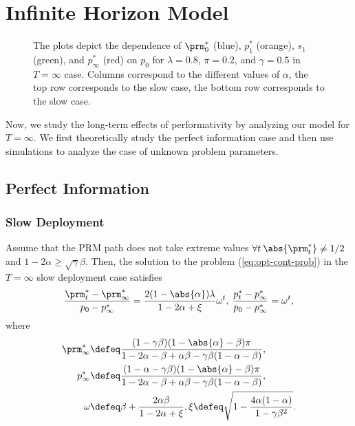 \section{Infinite Horizon Model}
\label{sec:infinite_horizon}

\begin{figure*}[ht]
    
    \caption{The plots depict the dependence of $\prm^*_0$ (blue), $p^*_1$
    (orange), $s_1$ (green), and $p^*_\infty$ (red) on $p_0$ for $\lambda =
    0.8$, $\pi = 0.2$, and $\gamma=0.5$ in $T=\infty$ case. Columns correspond
    to the different values of $\alpha$, the top row corresponds to the slow
    case, the bottom row corresponds to the slow case.}
    \label{fig:inf-sol}
\end{figure*}

Now, we study the long-term effects of performativity by analyzing our model
for $T=\infty$. We first theoretically study the perfect information case and then use simulations to analyze the case of unknown problem parameters.

\subsection{Perfect Information}
\label{sec:inf-slow}
\subsubsection{Slow Deployment}

\begin{theorem}
    \label{thm:inf-slow-sol}
    Assume that the PRM path does not take extreme values $\forall t \:
    \abs{\prm^*_t} \neq 1/2$ and $1 - 2 \alpha \ge \sqrt{\gamma} \beta$. Then,
    the solution to the problem (\ref{eq:opt-cont-prob}) in the $T=\infty$ slow deployment
    case satisfies
    \[
        \frac{\prm^*_t - \prm^*_\infty}{p_0 - p^*_\infty} = \frac{2 (1 -
        \abs{\alpha}) \lambda}{1 - 2 \alpha + \xi} \omega^t, \: \frac{p^*_t -
        p^*_\infty}{p_0 - p^*_\infty} = \omega^t, 
    \]
    where
    \[
        \begin{split}
            \prm^*_\infty & \defeq \frac{(1 - \gamma \beta) (1 - \abs{\alpha} -
            \beta) \pi}{1 - 2 \alpha - \beta + \alpha \beta - \gamma
            \beta (1 - \alpha - \beta)},\\
            p^*_\infty &\defeq \frac{(1 - \alpha - \gamma \beta) (1 -
            \abs{\alpha} - \beta) \pi}{1 - 2 \alpha - \beta + \alpha
            \beta - \gamma \beta (1 - \alpha - \beta)},\\
            \omega & \defeq \beta + \frac{2 \alpha \beta}{1 - 2 \alpha + \xi},
            \xi \defeq \sqrt{1 - \frac{4 \alpha (1 - \alpha)}{1 - \gamma
            \beta^2}}.
        \end{split}
    \]
\end{theorem}

